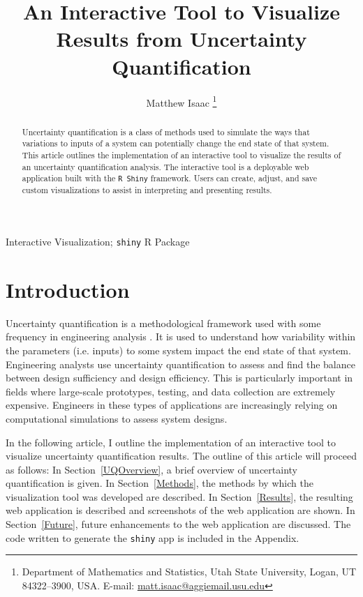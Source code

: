 \documentclass[11pt]{asaproc}\usepackage[]{graphicx}\usepackage[]{color}
\title{An Interactive Tool to Visualize Results from Uncertainty Quantification}
\author{Matthew Isaac \thanks{Department of Mathematics and Statistics, Utah State University, Logan, UT 84322--3900, USA. 
E-mail: \url{matt.isaac@aggiemail.usu.edu}}
}
\begin{document}
\renewcommand{\topfraction}{1.0}
\renewcommand{\bottomfraction}{1.0}
\renewcommand{\textfraction}{0.0}
\renewcommand{\floatpagefraction}{1.0}
\renewcommand{\dbltopfraction}{1.0}


\maketitle

\begin{abstract}
Uncertainty quantification is a class of methods used to simulate the ways that variations to inputs of a system can potentially change the end state of that system. This article outlines the implementation of an interactive tool to visualize the results of an uncertainty quantification analysis. The interactive tool is a deployable web application built with the {\tt R Shiny} framework. Users can create, adjust, and save custom visualizations to assist in interpreting and presenting results. 
\end{abstract}

\begin{keywords} Interactive Visualization; {\tt shiny} R Package
\end{keywords}


\section{Introduction}
\label{Introduction}

Uncertainty quantification is a methodological framework used with some frequency in engineering analysis \citep{EW2018}. It is used to understand how variability  within the parameters (i.e. inputs) to some system impact the end state of that system. Engineering analysts use uncertainty quantification to assess and find the balance between design sufficiency and design efficiency. This is particularly important in fields where large-scale prototypes, testing, and data collection are extremely expensive. Engineers in these types of applications are increasingly relying on computational simulations to assess system designs.

In the following article, I outline the implementation of an interactive tool to visualize uncertainty quantification results. The outline of this article will proceed as follows: In Section~\ref{UQOverview}, a brief overview of uncertainty quantification is given. In Section~\ref{Methods}, the methods by which the visualization tool was developed are described. In Section~\ref{Results}, the resulting web application is described and screenshots of the web application are shown. In Section~\ref{Future}, future enhancements to the web application are discussed. The code written to generate the {\tt shiny} app is included in the Appendix.
\end{document}
